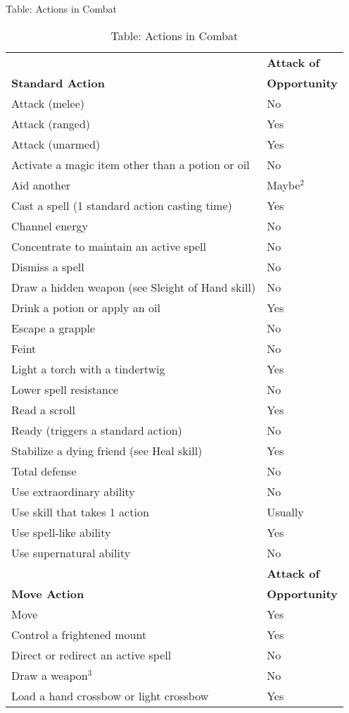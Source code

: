 Table: Actions in Combat
\begin{table}[]
\sffamily
\caption{Table: Actions in Combat}
\begin{tabular}{ll}
                         & \textbf{Attack of}\\
\textbf{Standard Action} & \textbf{Opportunity}\\
Attack (melee) & No\\
Attack (ranged) & Yes\\
Attack (unarmed) & Yes\\
Activate a magic item other than a potion or oil & No\\
Aid another & Maybe\(^{2}\)\\
Cast a spell (1 standard action casting time) & Yes\\
Channel energy & No\\
Concentrate to maintain an active spell & No\\
Dismiss a spell & No\\
Draw a hidden weapon (see Sleight of Hand skill) & No\\
Drink a potion or apply an oil & Yes\\
Escape a grapple & No\\
Feint & No\\
Light a torch with a tindertwig & Yes\\
Lower spell resistance & No\\
Read a scroll & Yes\\
Ready (triggers a standard action) & No\\
Stabilize a dying friend (see Heal skill) & Yes\\
Total defense & No\\
Use extraordinary ability & No\\
Use skill that takes 1 action & Usually\\
Use spell-like ability & Yes\\
Use supernatural ability & No\\
                         & \textbf{Attack of}\\
\textbf{Move Action} & \textbf{Opportunity}\\
Move & Yes\\
Control a frightened mount & Yes\\
Direct or redirect an active spell & No\\
Draw a weapon\(^{3}\) & No\\
Load a hand crossbow or light crossbow & Yes\\

\end{tabular}
\end{table}
